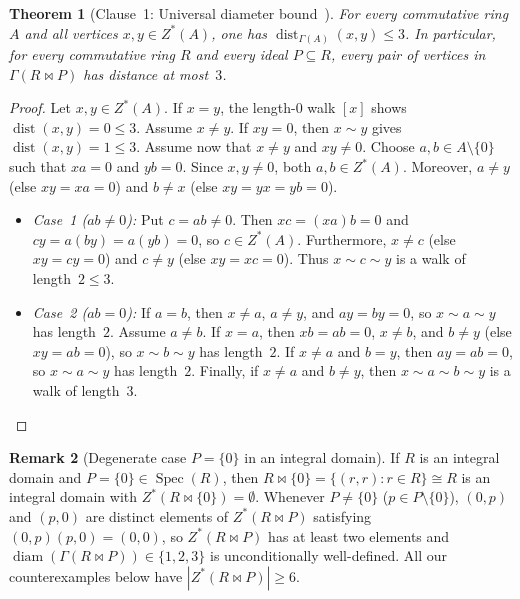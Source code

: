 \documentclass[11pt]{article}
\newtheorem{theorem}{Theorem}[section]
\theoremstyle{definition}
\newtheorem{remark}[theorem]{Remark}
\newcommand{\Spec}{\operatorname{Spec}}
\newcommand{\diam}{\operatorname{diam}}
\newcommand{\dist}{\operatorname{dist}}
\begin{document}
\begin{theorem}[Clause~1: Universal diameter bound~\cite{AndersonLivingston1999}]\label{thm:al-bound}
For every commutative ring $A$ and all vertices $x, y \in Z^*(A)$, one has
$\dist_{\Gamma(A)}(x, y) \le 3$. In particular, for every commutative ring $R$ and every
ideal $P \subseteq R$, every pair of vertices in $\Gamma(R \bowtie P)$ has distance at
most~$3$.
\end{theorem}
\begin{proof}
Let $x, y \in Z^*(A)$. If $x = y$, the length-$0$ walk $[x]$ shows $\dist(x, y) = 0 \le 3$.
Assume $x \neq y$. If $xy = 0$, then $x \sim y$ gives $\dist(x, y) = 1 \le 3$. Assume now
that $x \neq y$ and $xy \neq 0$. Choose $a, b \in A \setminus \{0\}$ such that $xa = 0$
and $yb = 0$. Since $x, y \neq 0$, both $a, b \in Z^*(A)$. Moreover, $a \neq y$ (else
$xy = xa = 0$) and $b \neq x$ (else $xy = yx = yb = 0$).
\begin{itemize}
  \item \emph{Case~1 ($ab \neq 0$):} Put $c = ab \neq 0$. Then $xc = (xa)b = 0$ and
  $cy = a(by) = a(yb) = 0$, so $c \in Z^*(A)$. Furthermore, $x \neq c$ (else $xy = cy = 0$)
  and $c \neq y$ (else $xy = xc = 0$). Thus $x \sim c \sim y$ is a walk of length~$2 \le 3$.
  \item \emph{Case~2 ($ab = 0$):} If $a = b$, then $x \neq a$, $a \neq y$, and $ay = by = 0$,
  so $x \sim a \sim y$ has length~$2$. Assume $a \neq b$. If $x = a$, then $xb = ab = 0$,
  $x \neq b$, and $b \neq y$ (else $xy = ab = 0$), so $x \sim b \sim y$ has length~$2$.
  If $x \neq a$ and $b = y$, then $ay = ab = 0$, so $x \sim a \sim y$ has length~$2$.
  Finally, if $x \neq a$ and $b \neq y$, then $x \sim a \sim b \sim y$ is a walk of
  length~$3$.\qedhere
\end{itemize}
\end{proof}

\begin{remark}[Degenerate case $P = \{0\}$ in an integral domain]\label{rem:empty}
If $R$ is an integral domain and $P = \{0\} \in \Spec(R)$, then
$R \bowtie \{0\} = \{(r, r) : r \in R\} \cong R$ is an integral domain with
$Z^*(R \bowtie \{0\}) = \emptyset$. Whenever $P \neq \{0\}$ ($p \in P \setminus \{0\}$),
$(0, p)$ and $(p, 0)$ are distinct elements of $Z^*(R \bowtie P)$ satisfying
$(0, p)(p, 0) = (0, 0)$, so $Z^*(R \bowtie P)$ has at least two elements and
$\diam(\Gamma(R \bowtie P)) \in \{1, 2, 3\}$ is unconditionally well-defined. All our
counterexamples below have $|Z^*(R \bowtie P)| \ge 6$.
\end{remark}
\end{document}
